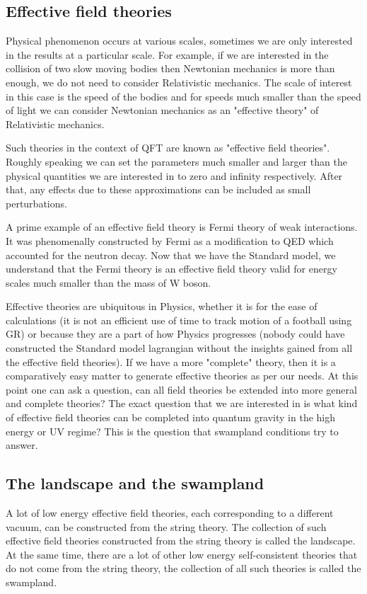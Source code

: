 \subsection{Effective field theories}
Physical phenomenon occurs at various scales, sometimes we are only interested in the results at a particular scale. For example, if we are interested in the collision of two slow moving bodies then Newtonian mechanics is more than enough, we do not need to consider Relativistic mechanics. The scale of interest in this case is the speed of the bodies and for speeds much smaller than the speed of light we can
consider Newtonian mechanics as an "effective theory" of Relativistic mechanics.

Such theories in the context of QFT are known as "effective field theories". Roughly speaking we can set the parameters much smaller and larger than the physical
quantities we are interested in to zero and infinity respectively. After that, any effects due to these approximations can be included as small perturbations.

A prime example of an effective field theory is Fermi theory of weak interactions. It was phenomenally constructed by Fermi as a modification to QED which accounted for the neutron decay. Now that we have the Standard model, we understand that the Fermi theory is an effective field theory valid for energy scales much smaller than the mass of W boson.

Effective theories are ubiquitous in Physics, whether it is for the ease of calculations (it is not an efficient use of time to track motion of a football using GR) or because they are a part of how Physics progresses (nobody could have constructed the Standard model lagrangian without the insights gained from all the effective field theories).
If we have a more "complete" theory, then it is a comparatively easy matter to generate effective theories as per our needs. At this point one can ask a question, can all field theories be extended into more general and complete theories?
The exact question that we are interested in is what kind of effective field theories can be completed into quantum gravity in the high energy or UV regime? This is the question that swampland conditions try to answer.


\subsection{The landscape and the swampland}
A lot of low energy effective field theories, each corresponding to a different vacuum, can be constructed from the string theory. The collection of such effective field theories constructed from the string theory is called the landscape. At the same time, there are a lot of other low energy self-consistent theories that do not come from the string theory, the collection of all such theories is called the swampland.


